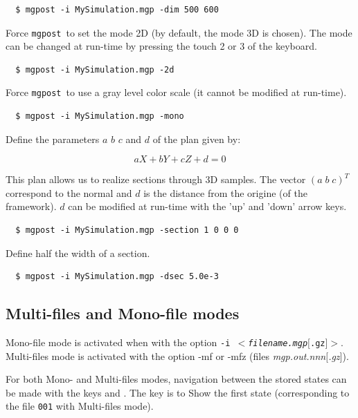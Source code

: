 \documentclass{simpledoc}
\newcommand{\mgpost}{\texttt{mgpost}\ }
\newcommand{\var}[1]{$<$#1$>$}
\newcommand{\opt}[1]{$[$#1$]$}
\newcommand{\file}[1]{\textit{#1}}
\newcommand{\screen}[1]{\texttt{#1}}
\newcommand{\key}[1]{\fbox{#1}}
\begin{document}
\begin{verbatim}
  $ mgpost -i MySimulation.mgp -dim 500 600
\end{verbatim}

Force \mgpost to set the mode 2D (by default, the mode 3D is chosen). The mode can be changed at run-time by pressing the touch 2 or 3 of the keyboard.

\begin{verbatim}
  $ mgpost -i MySimulation.mgp -2d
\end{verbatim}

Force \mgpost to use a gray level color scale (it cannot be modified at run-time).

\begin{verbatim}
  $ mgpost -i MySimulation.mgp -mono
\end{verbatim}

\marginlabel{\texttt{-section \var{a} \var{b} \var{c} \var{d}}}
Define the parameters  $a$ $b$ $c$ and $d$ of the plan given by:

\begin{equation}
aX + bY + cZ + d = 0 
\end{equation}

This plan allows us to realize sections through 3D samples.
The vector $(a\;b\;c)^T$ correspond to the normal and 
 $d$ is the distance from the origine (of the  framework).
$d$ can be modified at run-time with the 'up' and 'down' arrow keys.

\begin{verbatim}
  $ mgpost -i MySimulation.mgp -section 1 0 0 0
\end{verbatim}

\marginlabel{\texttt{-dsec \var{distance}}}
Define half the width of a section.

\begin{verbatim}
  $ mgpost -i MySimulation.mgp -dsec 5.0e-3
\end{verbatim}

\subsection{Multi-files and Mono-file modes}

Mono-file mode is activated when with the option \screen{-i \var{\file{filename.mgp}\opt{.gz}}}.
Multi-files mode is activated with the option -mf or -mfz (files \file{mgp.out.\textit{nnn}\opt{.gz}}).

For both Mono- and Multi-files modes, navigation between the stored states can be made with the keys \key{+} and \key{-}. The key \key{0} is to Show the first state (corresponding to the file \screen{001} with Multi-files mode).
\end{document}
